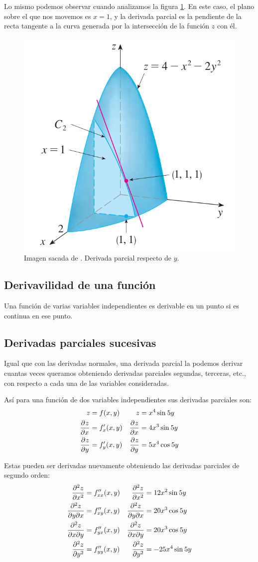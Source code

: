 \documentclass[12pt]{article}
\begin{document}
Lo mismo podemos observar cuando analizamos la figura \ref{fig:derivada_parcial_y}. En este caso, el plano sobre el que nos movemos es $ x = 1 $, y la derivada parcial es la pendiente de la recta tangente a la curva generada por la intersección de la función $ z $ con él.

\begin{figure}[H]
  \centering
  \includegraphics[width=0.3\linewidth]{imagenes/interp_geom_derivada_paracial_y.png}
  \caption{Imagen sacada de \parencite{stewart2}. Derivada parcial respecto de $ y $.}
  \label{fig:derivada_parcial_y}
\end{figure}

\subsection*{Derivavilidad de una función}
Una función de varias variables independientes es derivable en un punto si es continua en ese punto.

\subsection{Derivadas parciales sucesivas}
Igual que con las derivadas normales, una derivada parcial la podemos derivar cuantas veces queramos obteniendo derivadas parciales segundas, terceras, etc., con respecto a cada una de las variables consideradas.

Así para una función de dos variables independientes sus derivadas parciales son:
\begin{align*}
	z &= f(x,y) & z &= x^{4}\sin^{}5y\\
	\pdv[]{z}{x} &= f_{x}^{\prime}(x,y) & \pdv[]{z}{x} &= 4x^{3}\sin^{}5y\\
	\pdv[]{z}{y} &= f_{y}^{\prime}(x,y) & \pdv[]{z}{y} &= 5x^{4}\cos^{}5y
\end{align*}

Estas pueden ser derivadas nuevamente obteniendo las derivadas parciales de segundo orden:
\begin{align*}
	\pdv[2]{z}{x} &= f_{xx}^{\prime\prime}(x,y) & \pdv[2]{z}{x} &= 12x^{2}\sin^{}5y\\
	\pdv[2]{z}{y}{x} &= f_{xy}^{\prime\prime}(x,y) & \pdv[2]{z}{y}{x} &= 20x^{3}\cos^{}5y\\
	\pdv[2]{z}{x}{y} &= f_{yx}^{\prime\prime}(x,y) & \pdv[2]{z}{x}{y} &= 20x^{3}\cos^{}5y\\
	\pdv[2]{z}{y} &= f_{yy}^{\prime\prime}(x,y) & \pdv[2]{z}{y} &= -25x^{4}\sin^{}5y
\end{align*}
\end{document}
